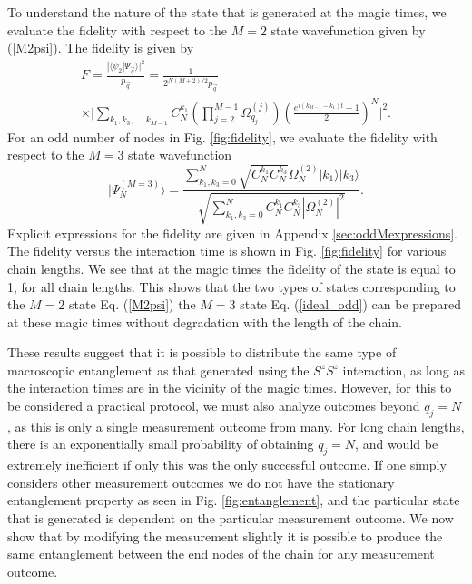 \documentclass[%
  prx,%
  twocolumn,%
  preprintnumbers,%
  amsmath,%
  amssymb,%
  superscriptaddress%
]{revtex4}
\begin{document}
To understand the nature of the state that is generated at the magic times,  we evaluate the fidelity with respect to the $ M = 2$ state wavefunction given by (\ref{M2psi}). The fidelity is given by 
%
\begin{multline}
F = \frac{| \langle  \psi_2 | \Psi_{\vec{q}} \rangle |^2}{p_{\vec{q}}}  = \frac{1}{2^{N(M+2)/2} p_{\vec{q}} } \\
\times \Big| \sum_{k_1, k_3, \dots, k_{M-1} }C_N^{k_1}
\left( \prod_{j=2}^{M-1} \Omega_{q_j}^{(j)} \right) \left(\frac{e^{i(k_{M-1} - k_1)t }+1}{2}\right)^N \Big|^2 .  
\label{fideven}
\end{multline}
%
For an odd number of nodes in Fig. \ref{fig:fidelity}, we evaluate the fidelity with respect to the $ M = 3$ state wavefunction
%
\begin{equation}
    \label{ideal_odd}
| \Psi_N^{(M=3)}  \rangle=\frac{\sum_{k_1,k_3=0}^{N} \sqrt{ C^{k_1}_{N}  C^{k_3}_{N} } 
 \Omega_{N}^{(2)}  |k_1\rangle|k_3\rangle }{\sqrt{\sum_{k_1,k_3=0}^{N}  C^{k_1}_{N}  C^{k_3}_{N} | \Omega_{N}^{(2)} |^2 } } .
\end{equation}
%
Explicit expressions for the fidelity are given in Appendix \ref{sec:oddMexpressions}.  The fidelity versus the interaction time is shown in Fig. \ref{fig:fidelity} for various chain lengths. We see that at the magic times the fidelity of the state is equal to 1, for all chain lengths.  This shows that the two types of states corresponding to the $ M = 2 $ state Eq. (\ref{M2psi}) the $ M = 3 $ state Eq. (\ref{ideal_odd}) can be prepared at these magic times without degradation with the length of the chain. 

These results suggest that it is possible to distribute the same type of macroscopic entanglement as that generated using the $ S^z S^z $ interaction, as long as the interaction times are in the vicinity of the magic times.  However, for this to be considered a practical protocol, we must also analyze outcomes beyond $ q_j = N $, as this is only a single measurement outcome from many. 
For long chain lengths, there is an exponentially small probability of obtaining $ q_j = N $, and  would be extremely inefficient if only this was the only successful outcome.  If one simply considers other measurement outcomes we do not have the stationary entanglement property as seen in Fig. \ref{fig:entanglement}, and the particular state that is generated is dependent on the particular measurement outcome.  We now show that by modifying the measurement slightly it is possible to produce the same entanglement between the end nodes of the chain for any measurement outcome.  
\end{document}

